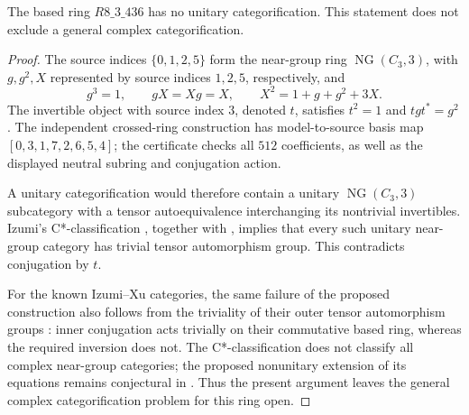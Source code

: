 \begin{proposition}
\label{prop:m3-r436-unitary}
The based ring \(R8\_3\_436\) has no unitary categorification.
This statement does not exclude a general complex categorification.
\end{proposition}
\begin{proof}
The source indices \(\{0,1,2,5\}\) form the near-group ring
\(\operatorname{NG}(C_3,3)\), with \(g,g^2,X\) represented by source
indices \(1,2,5\), respectively, and
\[
 g^3=1,\qquad gX=Xg=X,\qquad X^2=1+g+g^2+3X.
\]
The invertible object with source index \(3\), denoted \(t\), satisfies
\(t^2=1\) and \(tgt^*=g^2\).  The independent crossed-ring construction
has model-to-source basis map \([0,3,1,7,2,6,5,4]\); the certificate checks
all \(512\) coefficients, as well as the displayed neutral subring and
conjugation action.

A unitary categorification would therefore contain a unitary
\(\operatorname{NG}(C_3,3)\) subcategory with a tensor autoequivalence
interchanging its nontrivial invertibles.  Izumi's C*-classification
\cite[Theorem~9.1 and Example~9.4]{IzumiNear}, together with
\cite[Example~13.7]{IzumiNear}, implies that every such unitary
near-group category has trivial tensor automorphism group.  This
contradicts conjugation by \(t\).

For the known Izumi--Xu categories, the same failure of the proposed
construction also follows from the triviality of their outer tensor
automorphism groups \cite[Section~4.2, following Remark~4.10, and
Remark~4.11]{GJSCyclic}: inner conjugation acts trivially on their
commutative based ring, whereas the required inversion does not.
The C*-classification does not classify all complex near-group
categories; the proposed nonunitary extension of its equations remains
conjectural in \cite[Remark~9.2]{IzumiNear}.  Thus the present argument
leaves the general complex categorification problem for this ring open.
\end{proof}
